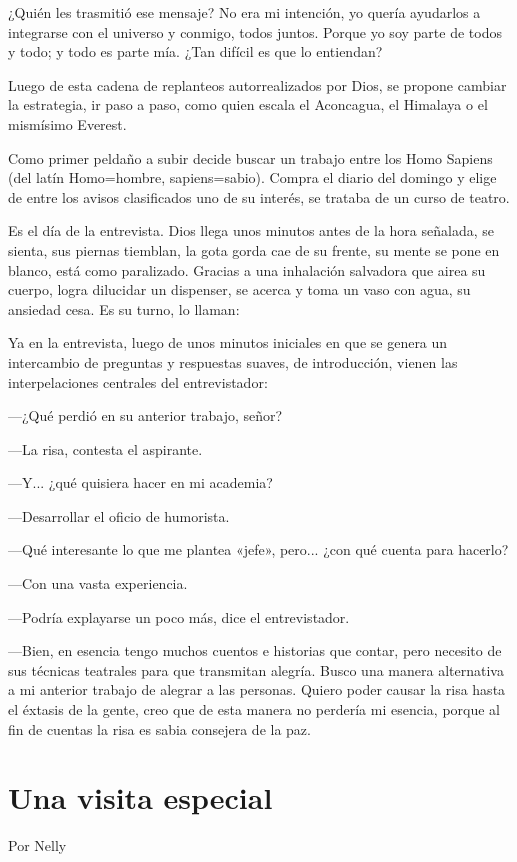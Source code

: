 \documentclass[11pt,twoside,openright,a5paper]{book}
\begin{document}
¿Quién les trasmitió ese mensaje? No era mi intención, yo quería ayudarlos a integrarse con el universo y conmigo, todos juntos. Porque yo soy parte de todos y todo; y todo es parte mía. ¿Tan difícil es que lo entiendan?

Luego de esta cadena de replanteos autorrealizados por Dios, se propone cambiar la estrategia, ir paso a paso, como quien escala el Aconcagua, el Himalaya o el mismísimo Everest. 

Como primer peldaño a subir decide buscar un trabajo entre los Homo Sapiens (del latín Homo=hombre, sapiens=sabio). Compra el diario del domingo y elige de entre los avisos clasificados uno de su interés, se trataba de un curso de teatro.

Es el día de la entrevista. Dios llega unos minutos antes de la hora señalada, se sienta, sus piernas tiemblan, la gota gorda cae de su frente, su mente se pone en blanco, está como paralizado. Gracias a una inhalación salvadora que airea su cuerpo, logra dilucidar un dispenser, se acerca y toma un vaso con agua, su ansiedad cesa. Es su turno, lo llaman:

Ya en la entrevista, luego de unos minutos iniciales en que se genera un intercambio de preguntas y respuestas suaves, de introducción, vienen las interpelaciones centrales del entrevistador:

---¿Qué perdió en su anterior trabajo, señor? 

---La risa, contesta el aspirante.

---Y... ¿qué quisiera hacer en mi academia?

---Desarrollar el oficio de humorista.

---Qué interesante lo que me plantea «jefe», pero... ¿con qué cuenta para hacerlo? 

---Con una vasta experiencia.

---Podría explayarse un poco más, dice el entrevistador.

---Bien, en esencia tengo muchos cuentos e historias que contar, pero necesito de sus técnicas teatrales para que transmitan alegría. Busco una manera alternativa a mi anterior trabajo de alegrar a las personas. Quiero poder causar la risa hasta el éxtasis de la gente, creo que de esta manera no perdería mi esencia, porque al fin de cuentas la risa es sabia consejera de la paz.

\section*{Una visita especial}
                                                                                              \begin{flushright}Por Nelly\end{flushright}
 
\end{document}
